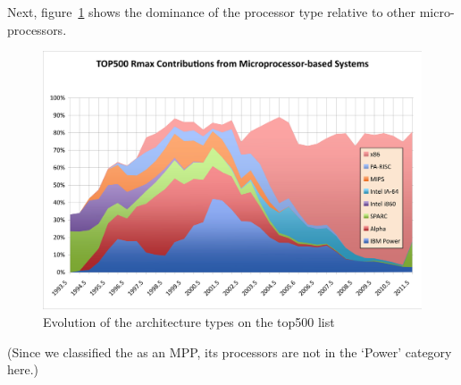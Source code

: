 Next, figure~\ref{fig:top500-processor} shows the dominance of the
 processor type relative to other micro-processors.
\begin{figure}[ht]
  \includegraphics[scale=.6]{graphics-public/top500/processor}
  \caption{Evolution of the architecture types on the top500 list}
  \label{fig:top500-processor}
\end{figure}
(Since we classified the  as an MPP, its
processors are not in the `Power' category here.)

